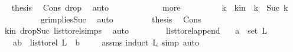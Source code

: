 \begin{isabellebody}
\ \isamarkupfalse%
\ {\isacharquery}{\kern0pt}thesis\ \isamarkupfalse%
\ Cons\ drop{\isacharunderscore}{\kern0pt}{}\ \isamarkupfalse%
\ auto\isanewline
\ \ \ \ \isamarkupfalse%
\isanewline
\ \ \ \ \ \ \isamarkupfalse%
\ more\isanewline
\ \ \ \ \ \ \isamarkupfalse%
\ \isamarkupfalse%
\ k{}\ \ k{}{\isacharunderscore}{\kern0pt}in{\isacharcolon}{\kern0pt}\ \ {\isachardoublequoteopen}k\ {\isacharequal}{\kern0pt}\ Suc\ k{}{\isachardoublequoteclose}\isanewline
\ \ \ \ \ \ \ \ \isamarkupfalse%
\ gr{}{\isacharunderscore}{\kern0pt}implies{\isacharunderscore}{\kern0pt}Suc\ \isamarkupfalse%
\ auto\ \isanewline
\ \ \ \ \ \ \isamarkupfalse%
\ {\isacharquery}{\kern0pt}thesis\ \isamarkupfalse%
\ Cons\ \isamarkupfalse%
\ k{}{\isacharunderscore}{\kern0pt}in\ drop{\isacharunderscore}{\kern0pt}Suc\ list{\isacharunderscore}{\kern0pt}to{\isacharunderscore}{\kern0pt}rel{\isachardot}{\kern0pt}simps{\isacharparenleft}{\kern0pt}{}{\isacharparenright}{\kern0pt}\ \isamarkupfalse%
\ auto\isanewline
\ \ \ \ \isamarkupfalse%
\isanewline
\ \ \isamarkupfalse%
\isanewline
{}\isamarkupfalse%
%
\endisatagproof
{\isafoldproof}%
%
\isadelimproof
\isanewline
%
\endisadelimproof
\isanewline
{}\isamarkupfalse%
\ list{\isacharunderscore}{\kern0pt}to{\isacharunderscore}{\kern0pt}rel{\isacharunderscore}{\kern0pt}append{\isacharcolon}{\kern0pt}\isanewline
\ \ \ {\isachardoublequoteopen}a\ {\isasymin}\ set\ L{\isachardoublequoteclose}\isanewline
\ \ \ {\isachardoublequoteopen}{\isacharparenleft}{\kern0pt}a{\isacharcomma}{\kern0pt}b{\isacharparenright}{\kern0pt}\ {\isasymin}\ list{\isacharunderscore}{\kern0pt}to{\isacharunderscore}{\kern0pt}rel\ {\isacharparenleft}{\kern0pt}L\ {\isacharat}{\kern0pt}\ {\isacharbrackleft}{\kern0pt}b{\isacharbrackright}{\kern0pt}{\isacharparenright}{\kern0pt}{\isachardoublequoteclose}\ \isanewline
%
\isadelimproof
\ \ %
\endisadelimproof
%
\isatagproof
{}\isamarkupfalse%
\ assms\isanewline
{}\isamarkupfalse%
{\isacharparenleft}{\kern0pt}induct\ L{\isacharcomma}{\kern0pt}\ simp{\isacharcomma}{\kern0pt}\ auto{\isacharparenright}{\kern0pt}\ \isamarkupfalse%
%
\endisatagproof
{\isafoldproof}%
%
\isadelimproof

\end{isabellebody}

